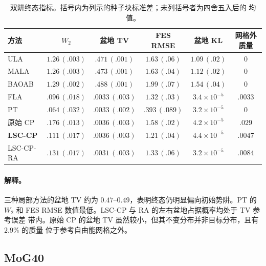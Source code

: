 \documentclass[11pt,a4paper]{article}
\renewcommand{\textsc}[1]{\textsf{\MakeUppercase{#1}}}
\begin{document}
\begin{table}[H]
\centering
\footnotesize
\setlength{\tabcolsep}{4.2pt}
\begin{tabular}{lccccc}
\toprule
方法 & $W_2$ & 盆地 TV & FES RMSE & 盆地 KL & 网格外质量 \\
\midrule
\textsc{ula} & $1.26\,(.003)$ & $.471\,(.001)$ & $1.63\,(.06)$ & $1.09\,(.02)$ & $0$ \\
\textsc{mala} & $1.26\,(.003)$ & $.473\,(.001)$ & $1.63\,(.04)$ & $1.12\,(.02)$ & $0$ \\
\textsc{baoab} & $1.29\,(.002)$ & $.488\,(.001)$ & $1.99\,(.07)$ & $1.54\,(.04)$ & $0$ \\
\textsc{fla} & $.096\,(.018)$ & $.0033\,(.003)$ & $1.32\,(.03)$ & $3.4{\times}10^{-5}$ & $.0033$ \\
\textsc{pt} & $.064\,(.032)$ & $.0033\,(.002)$ & $.393\,(.089)$ & $3.2{\times}10^{-5}$ & $0$ \\
原始 \textsc{cp} & $.176\,(.013)$ & $.0036\,(.003)$ & $1.58\,(.02)$ & $4.2{\times}10^{-5}$ & $.029$ \\
\textbf{\textsc{lsc-cp}} & $.111\,(.017)$ & $.0036\,(.003)$ & $1.21\,(.04)$ & $4.4{\times}10^{-5}$ & $.0047$ \\
\textsc{lsc-cp-ra} & $.131\,(.017)$ & $.0031\,(.003)$ & $1.33\,(.06)$ & $3.2{\times}10^{-5}$ & $.0084$ \\
\bottomrule
\end{tabular}
\caption{双阱终态指标。括号内为列示的种子块标准差；未列括号者为四舍五入后的
均值。}
\end{table}

\paragraph{解释。}
三种局部方法的盆地 TV 约为 $0.47$--$0.49$，表明终态仍明显偏向初始势阱。PT 的
$W_2$ 和 FES RMSE 数值最低。LSC-CP 与 RA 的左右盆地占据概率均处于 TV 参考误差
带内。原始 CP 的盆地 TV 虽然较小，但其不变分布并非目标分布，且有 $2.9\%$ 的质量
位于参考自由能网格之外。

\subsection{MoG40}
\end{document}
